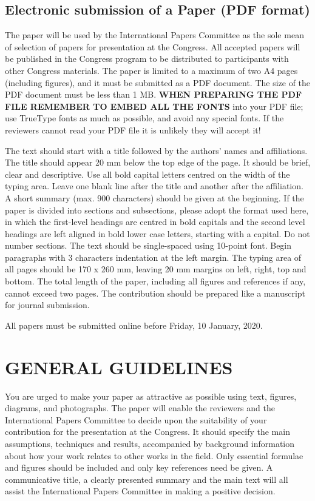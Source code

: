 \documentclass[10pt, a4paper]{article}
\begin{document}
\subsection{Electronic submission of a Paper (PDF format)}

The paper will be used by the International Papers Committee as the sole mean of selection of papers for presentation at the Congress. All accepted papers will be published in the Congress program to be distributed to participants with other Congress materials. The paper is limited to a maximum of two A4 pages (including figures), and it must be submitted as a PDF document. The size of the PDF document must be less than 1 MB. \textbf{WHEN PREPARING THE PDF FILE REMEMBER TO EMBED ALL THE FONTS} into your PDF file; use TrueType fonts as much as possible, and avoid any special fonts.  If the reviewers cannot read your PDF file it is unlikely they will accept it!

The text should start with a title followed by the authors’ names and affiliations. The title should appear 20 mm below the top edge of the page. It should be brief, clear and descriptive. Use all bold capital letters centred on the width of the typing area. Leave one blank line after the title and another after the affiliation. A short summary (max. 900 characters) should be given at the beginning. If the paper is divided into sections and subsections, please adopt the format used here, in which the first-level headings are centred in bold capitals and the second level headings are left aligned in bold lower case letters, starting with a capital. Do not number sections. The text should be single-spaced using 10-point font. Begin paragraphs with 3 characters indentation at the left margin. The typing area of all pages should be 170 x 260 mm, leaving 20 mm margins on left, right, top and bottom. The total length of the paper, including all figures and references if any, cannot exceed two pages. The contribution should be prepared like a manuscript for journal submission.

All papers must be submitted online before Friday, 10 January, 2020.

\section{GENERAL GUIDELINES}

You are urged to make your paper as attractive as possible using text, figures, diagrams, and photographs. The paper will enable the reviewers and the International Papers Committee to decide upon the suitability of your contribution for the presentation at the Congress. It should specify the main assumptions, techniques and results, accompanied by background information about how your work relates to other works in the field. Only essential formulae and figures should be included and only key references need be given. A communicative title, a clearly presented summary and the main text will all assist the International Papers Committee in making a positive decision.
\end{document}
